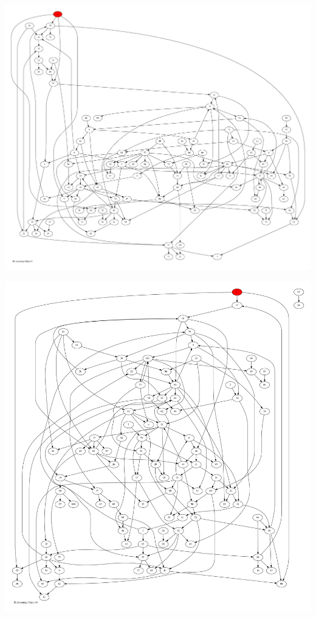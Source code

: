 \documentclass{article}
\begin{document}
\newpage
\includegraphics[max height=\textheight,max width=\textwidth]{bl_looming_objs/bl_loom_obj9_pp.pdf}

\newpage
\includegraphics[max height=\textheight,max width=\textwidth]{bl_looming_objs/bl_loom_obj10_pp.pdf}
\end{document}
